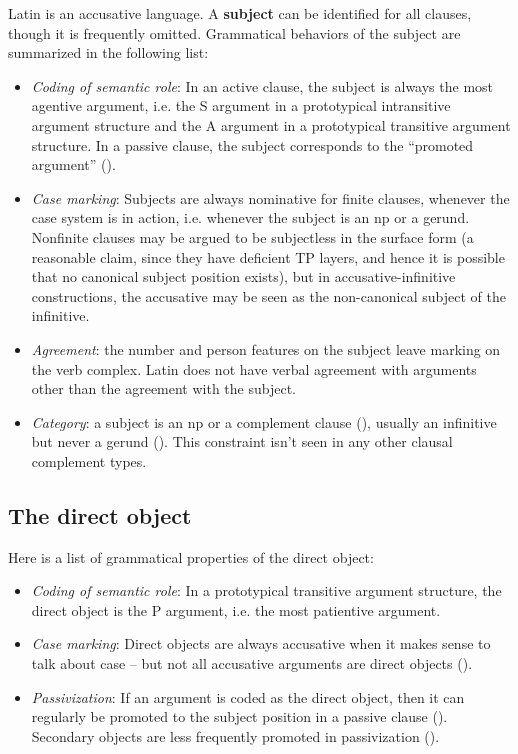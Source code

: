 \documentclass[a4paper, oneside]{report}
\newcommand*{\concept}[1]{\textbf{#1}}
\begin{document}
Latin is an accusative language.
A \concept{subject} can be identified for all clauses, 
though it is frequently omitted.
Grammatical behaviors of the subject are summarized in the following list: 
\begin{itemize}
    \item \emph{Coding of semantic role}: In an active clause, 
    the subject is always the most agentive argument,
    i.e. the S argument in a prototypical intransitive argument structure 
    and the A argument in a prototypical transitive argument structure.
    In a passive clause, 
    the subject corresponds to the ``promoted argument'' ().  
    \item \emph{Case marking}: 
    Subjects are always nominative for finite clauses,
    whenever the case system is in action,
    i.e. whenever the subject is an \ac{np} or a gerund. 
    Nonfinite clauses may be argued to be subjectless in the surface form 
    (a reasonable claim, since they have deficient TP layers, 
    and hence it is possible that no canonical subject position exists),
    but in accusative-infinitive constructions, %
    the accusative may be seen as the non-canonical subject of the infinitive.
    \item \emph{Agreement}: 
    the number and person features on the subject leave marking on the verb complex.
    Latin does not have verbal agreement with arguments other than the agreement with the subject.
    \item \emph{Category}: a subject is an \ac{np}  
    or a complement clause (), 
    usually an infinitive but never a gerund ().
    This constraint isn't seen in any other clausal complement types.
\end{itemize}


\subsection{The direct object}\label{sec:vp.complement.direct-object}

Here is a list of grammatical properties of the direct object:
\begin{itemize}
    \item \emph{Coding of semantic role}: In a prototypical transitive argument structure, 
    the direct object is the P argument, i.e. the most patientive argument. 

    \item \emph{Case marking}: Direct objects are always accusative when it makes sense to talk about case -- 
    but not all accusative arguments are direct objects ().
    \item \emph{Passivization}: If an argument is coded as the direct object, 
    then it can regularly be promoted to the subject position in a passive clause (). 
    Secondary objects are less frequently promoted in passivization ().
\end{itemize}
\end{document}
